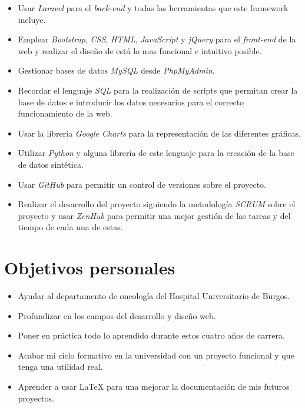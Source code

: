 \begin{itemize}
    \item Usar \textit{Laravel} para el \textit{back-end} y todas las herramientas que este framework incluye.
    \item Emplear \textit{Bootstrap}, \textit{CSS}, \textit{HTML}, \textit{JavaScript} y \textit{jQuery} para el \textit{front-end} de la web y realizar el diseño de está lo mas funcional e intuitivo posible.
    \item Gestionar bases de datos \textit{MySQL} desde \textit{PhpMyAdmin}.
    \item Recordar el lenguaje \textit{SQL} para la realización de scripts que permitan crear la base de datos e introducir los datos necesarios para el correcto funcionamiento de la web.
    \item Usar la librería \textit{Google Charts} para la representación de las diferentes gráficas.
    \item Utilizar \textit{Python} y alguna librería de este lenguaje para la creación de la base de datos sintética.
    \item Usar \textit{GitHub} para permitir un control de versiones sobre el proyecto.
    \item Realizar el desarrollo del proyecto siguiendo la metodología \textit{SCRUM} sobre el proyecto y usar \textit{ZenHub} para permitir una mejor gestión de las tareas y del tiempo de cada una de estas.
\end{itemize}
\section{Objetivos personales}
\begin{itemize}
    \item Ayudar al departamento de oncología del Hospital Universitario de Burgos.
    \item Profundizar en los campos del desarrollo y diseño web.
    \item Poner en práctica todo lo aprendido durante estos cuatro años de carrera.
    \item Acabar mi ciclo formativo en la universidad con un proyecto funcional y que tenga una utilidad real.
    \item Aprender a usar \LaTeX{} para una mejorar la documentación de mis futuros proyectos.
\end{itemize}